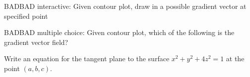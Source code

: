  \begin{question}
 BADBAD interactive:
 	Given contour plot, draw in a possible gradient vector at specified point
 \end{question}
 
 \begin{question}
 BADBAD multiple choice:
 	Given contour plot, which of the following is the gradient vector field?
 \end{question}

\begin{question}
	Write an equation for the tangent plane to the surface $x^2+y^2+4z^2 = 1$ at the point $(a,b,c)$.
\end{question}


